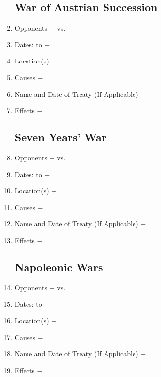 \documentclass[12pt]{article}
\begin{document}
\begin{enumerate}
\subsection{War of Austrian Succession}

\item Opponents $-$ vs.

\item Dates: to $-$

\item Location(s) $-$ 

\item Causes $-$

\item Name and Date of Treaty (If Applicable) $-$ 

\item Effects $-$ 

\subsection{Seven Years' War}

\item Opponents $-$ vs.

\item Dates: to $-$

\item Location(s) $-$ 

\item Causes $-$

\item Name and Date of Treaty (If Applicable) $-$ 

\item Effects $-$

\subsection{Napoleonic Wars} 

\item Opponents $-$ vs.

\item Dates: to $-$

\item Location(s) $-$ 

\item Causes $-$

\item Name and Date of Treaty (If Applicable) $-$ 

\item Effects $-$ 


\end{enumerate}
\end{document}
